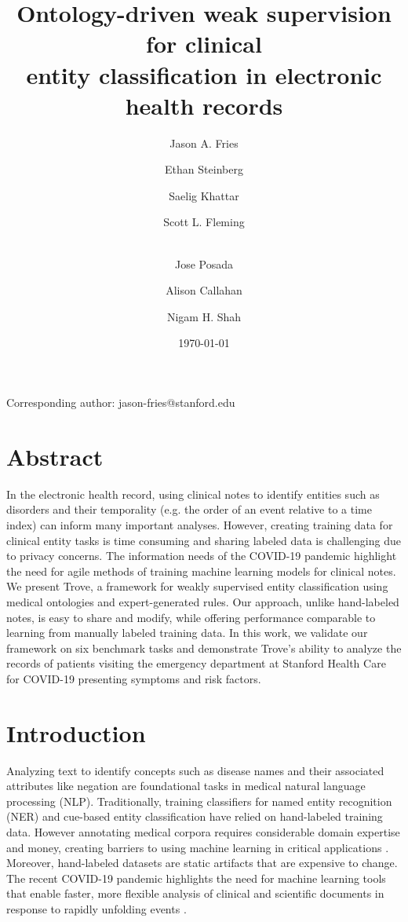 \documentclass{article}
\title{Ontology-driven weak supervision for clinical \\ entity classification in electronic health records}
\author[1]{Jason A. Fries}
\author[1,2]{Ethan Steinberg}
\author[2]{Saelig Khattar}
\author[1]{Scott L. Fleming}
\author[1]{\\ Jose Posada}
\author[1]{Alison Callahan}
\author[1]{Nigam H. Shah}
\affil[1]{Center for Biomedical Informatics Research, Stanford University}
\affil[2]{Department of Computer Science, Stanford University}
\date{\today}
\begin{document}
\maketitle


\begin{center}
 Corresponding author: jason-fries@stanford.edu 
\end{center}

\section*{Abstract}

\noindent In the electronic health record, using clinical notes to identify entities such as disorders and their temporality (e.g. the order of an event relative to a time index) can inform many important analyses. 
However, creating training data for clinical entity tasks is time consuming and sharing labeled data is challenging due to privacy concerns. 
The information needs of the COVID-19 pandemic highlight the need for agile methods of training machine learning models for clinical notes. 
We present Trove, a framework for weakly supervised entity classification using medical ontologies and expert-generated rules. 
Our approach, unlike hand-labeled notes, is easy to share and modify, while offering performance comparable to learning from manually labeled training data. 
In this work, we validate our framework on six benchmark tasks and demonstrate Trove's ability to analyze the records of patients visiting the emergency department at Stanford Health Care for COVID-19 presenting symptoms and risk factors. 


\section*{Introduction}
\label{sec:introduction}


Analyzing text to identify concepts such as disease names and their associated attributes like negation are foundational tasks in medical natural language processing (NLP). 
Traditionally, training classifiers for named entity recognition (NER) and cue-based entity classification have relied on hand-labeled training data. 
However annotating medical corpora requires considerable domain expertise and money, creating barriers to using machine learning in critical applications \cite{Ravi2017-zz, Esteva2019-nn}.
Moreover, hand-labeled datasets are static artifacts that are expensive to change.   
The recent COVID-19 pandemic highlights the need for machine learning tools that enable faster, more flexible analysis of clinical and scientific documents in response to rapidly unfolding events \cite{Lu_Wang2020-up}.
\end{document}
